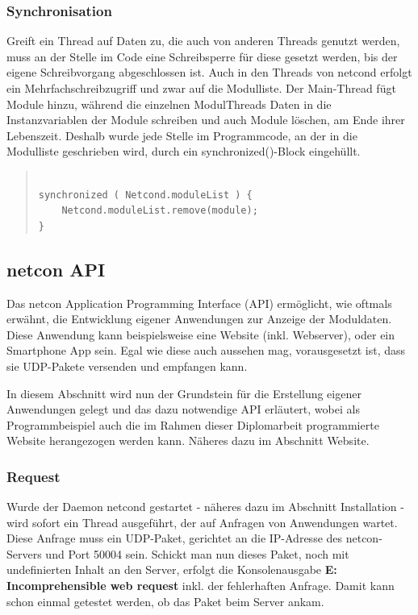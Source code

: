 \documentclass[a4paper,14pt,headsepline]{scrartcl}
\begin{document}
\newpage

\subsubsection*{Synchronisation}

Greift ein Thread auf Daten zu, die auch von anderen Threads genutzt werden, muss an der Stelle im Code eine Schreibsperre für diese gesetzt werden, bis der eigene Schreibvorgang abgeschlossen ist. Auch in den Threads von netcond erfolgt ein Mehrfachschreibzugriff und zwar auf die Modulliste. Der Main-Thread fügt Module hinzu, während die einzelnen ModulThreads Daten in die Instanzvariablen der Module schreiben und auch Module löschen, am Ende ihrer Lebenszeit. Deshalb wurde jede Stelle im Programmcode, an der in die Modulliste geschrieben wird, durch ein synchronized()-Block eingehüllt.    
					
\begin{quote}
\begin{verbatim}

synchronized ( Netcond.moduleList ) {
    Netcond.moduleList.remove(module);
}

\end{verbatim}
\end{quote} 

\newpage

\subsection{netcon API}

Das netcon Application Programming Interface (API) ermöglicht, wie oftmals erwähnt, die Entwicklung eigener Anwendungen zur Anzeige der Moduldaten. Diese Anwendung kann beispielsweise eine Website (inkl. Webserver), oder ein Smartphone App sein. Egal wie diese auch aussehen mag, vorausgesetzt ist, dass sie UDP-Pakete versenden und empfangen kann. 

In diesem Abschnitt wird nun der Grundstein für die Erstellung eigener Anwendungen gelegt und das dazu notwendige API erläutert, wobei als Programmbeispiel auch die im Rahmen dieser Diplomarbeit programmierte Website herangezogen werden kann. Näheres dazu im Abschnitt Website. 

\subsubsection*{Request}
Wurde der Daemon netcond gestartet - näheres dazu im Abschnitt Installation - wird sofort ein Thread ausgeführt, der auf Anfragen von Anwendungen wartet. Diese Anfrage muss ein UDP-Paket, gerichtet an die IP-Adresse des netcon-Servers und Port 50004 sein. Schickt man nun dieses Paket, noch mit undefinierten Inhalt an den Server, erfolgt die Konsolenausgabe \textbf{E: Incomprehensible web request} inkl. der fehlerhaften Anfrage. Damit kann schon einmal getestet werden, ob das Paket beim Server ankam. 
\end{document}
